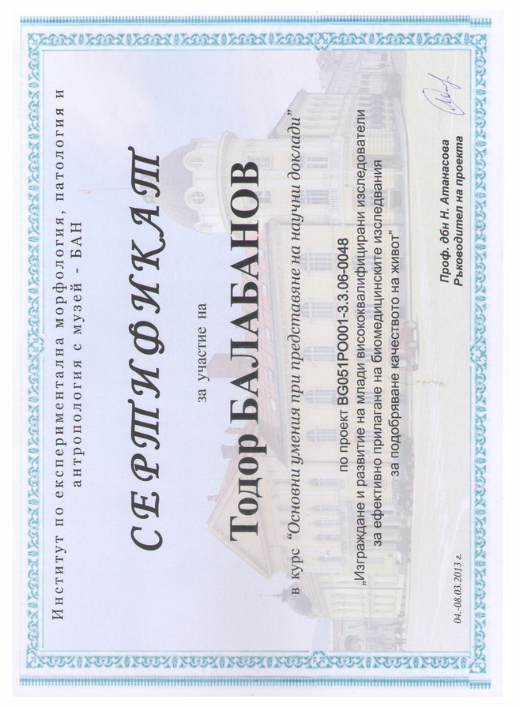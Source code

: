 \documentclass[english,a4paper]{europasscv}
\begin{document}
\includegraphics[width=\textwidth,height=\textheight,keepaspectratio]{IEMPAM2013_2}
\end{document}
